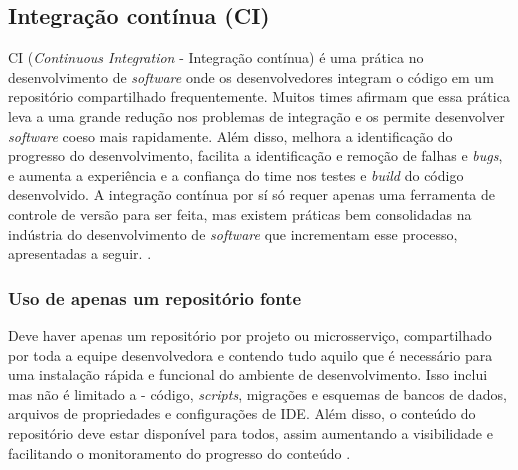 
\subsection{Integração contínua (CI)}
CI (\emph{Continuous Integration} - Integração contínua) é uma prática no desenvolvimento de \emph{software} onde os desenvolvedores integram o código em um repositório compartilhado frequentemente. Muitos times afirmam que essa prática leva a uma grande redução nos problemas de integração e os permite desenvolver \emph{software} coeso mais rapidamente. Além disso, melhora a identificação do progresso do desenvolvimento, facilita a identificação e remoção de falhas e \emph{bugs}, e aumenta a experiência e a confiança do time nos testes e \emph{build} do código desenvolvido. A integração contínua por sí só requer apenas uma ferramenta de controle de versão para ser feita, mas existem práticas bem consolidadas na indústria do desenvolvimento de \emph{software} que incrementam esse processo, apresentadas a seguir. \cite{martin-fowler-continuous-integration}.


\subsubsection{Uso de apenas um repositório fonte}
Deve haver apenas um repositório por projeto ou microsserviço, compartilhado por toda a equipe desenvolvedora e contendo tudo aquilo que é necessário para uma instalação rápida e funcional do ambiente de desenvolvimento. Isso inclui mas não é limitado a - código, \emph{scripts}, migrações e esquemas de bancos de dados, arquivos de propriedades e configurações de IDE. Além disso, o conteúdo do repositório deve estar disponível para todos, assim aumentando a visibilidade e facilitando o monitoramento do progresso do conteúdo \cite{gitlab-ci-cd,martin-fowler-continuous-integration}.

